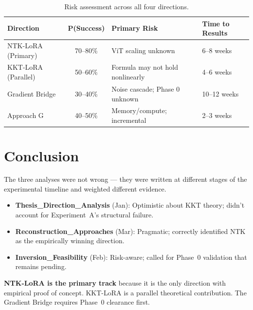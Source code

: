\documentclass[11pt,a4paper]{article}
\begin{document}
\begin{table}[H]
\centering
\caption{Risk assessment across all four directions.}
\label{tab:risk}
\begin{tabular}{lcll}
\toprule
\textbf{Direction} & \textbf{P(Success)} & \textbf{Primary Risk} & \textbf{Time to Results} \\
\midrule
NTK-LoRA (Primary)   & 70--80\% & ViT scaling unknown       & 6--8 weeks \\
KKT-LoRA (Parallel)  & 50--60\% & Formula may not hold nonlinearly & 4--6 weeks \\
Gradient Bridge       & 30--40\% & Noise cascade; Phase 0 unknown  & 10--12 weeks \\
Approach G            & 40--50\% & Memory/compute; incremental     & 2--3 weeks \\
\bottomrule
\end{tabular}
\end{table}


\section{Conclusion}

The three analyses were not wrong --- they were written at different stages of the experimental timeline and weighted different evidence.

\begin{itemize}
    \item \textbf{Thesis\_Direction\_Analysis} (Jan): Optimistic about KKT theory; didn't account for Experiment~A's structural failure.
    \item \textbf{Reconstruction\_Approaches} (Mar): Pragmatic; correctly identified NTK as the empirically winning direction.
    \item \textbf{Inversion\_Feasibility} (Feb): Risk-aware; called for Phase~0 validation that remains pending.
\end{itemize}

\textbf{NTK-LoRA is the primary track} because it is the only direction with empirical proof of concept. KKT-LoRA is a parallel theoretical contribution. The Gradient Bridge requires Phase~0 clearance first.

\bigskip
\begin{center}
\end{center}
\end{document}
